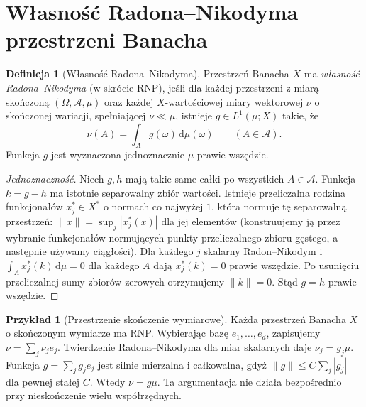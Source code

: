\documentclass[11pt,a4paper,oneside]{book}
\numberwithin{equation}{chapter}
\theoremstyle{plain}
\theoremstyle{definition}
\newtheorem{definicja}[twierdzenie]{Definicja}
\newtheorem{przyklad}[twierdzenie]{Przykład}
\theoremstyle{remark}
\begin{document}
\section{Własność Radona--Nikodyma przestrzeni Banacha}
\label{sec:rnp-30}
\begin{definicja}[Własność Radona--Nikodyma]
\label{def:RNP-30}
Przestrzeń Banacha $X$ ma \emph{własność Radona--Nikodyma}
(w skrócie RNP), jeśli dla każdej przestrzeni z miarą
skończoną $(\Omega,\mathcal A,\mu)$ oraz każdej
$X$-wartościowej miary wektorowej $\nu$ o skończonej
wariacji, spełniającej $\nu\ll\mu$, istnieje
$g\in L^1(\mu;X)$ takie, że
\begin{equation}\label{eq:RNP-30}
 \nu(A)=\int_Ag(\omega)\,\mathrm d\mu(\omega)
 \qquad(A\in\mathcal A).
\end{equation}
Funkcja $g$ jest wyznaczona jednoznacznie
$\mu$-prawie wszędzie.
\end{definicja}
\begin{proof}[Jednoznaczność]
Niech $g,h$ mają takie same całki po wszystkich
$A\in\mathcal A$. Funkcja $k=g-h$ ma istotnie
separowalny zbiór wartości. Istnieje przeliczalna
rodzina funkcjonałów $x_j^*\in X^*$ o normach co
najwyżej $1$, która normuje tę separowalną przestrzeń:
$\|x\|=\sup_j|x_j^*(x)|$ dla jej elementów
(konstruujemy ją przez wybranie funkcjonałów
normujących punkty przeliczalnego zbioru gęstego,
a następnie używamy ciągłości).
Dla każdego $j$ skalarny Radon--Nikodym i
$\int_A x_j^*(k)\,\mathrm d\mu=0$ dla każdego $A$
dają $x_j^*(k)=0$ prawie wszędzie. Po usunięciu
przeliczalnej sumy zbiorów zerowych otrzymujemy
$\|k\|=0$. Stąd $g=h$ prawie wszędzie.
\end{proof}

\begin{przyklad}[Przestrzenie skończenie wymiarowe]
Każda przestrzeń Banacha $X$ o skończonym wymiarze
ma RNP. Wybierając bazę $e_1,\ldots,e_d$,
zapisujemy $\nu=\sum_j\nu_je_j$.
Twierdzenie Radona--Nikodyma dla miar skalarnych
daje $\nu_j=g_j\mu$. Funkcja
$g=\sum_jg_je_j$ jest silnie mierzalna i całkowalna,
gdyż $\|g\|\le C\sum_j|g_j|$ dla pewnej stałej $C$.
Wtedy $\nu=g\mu$. Ta argumentacja nie działa
bezpośrednio przy nieskończenie wielu współrzędnych.
\end{przyklad}
\end{document}
